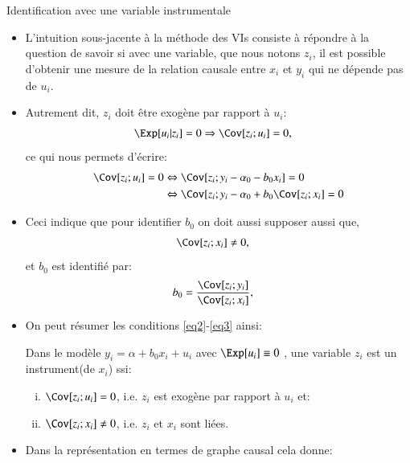 \begin{frame}[allowframebreaks]{Identification avec une variable instrumentale}
    \begin{itemize}
\item L'intuition sous-jacente à la méthode des VIs consiste à répondre à la question 
de savoir si avec une variable, que nous notons $z_i$, il est possible d'obtenir 
une mesure de la relation causale entre $x_i$ et $y_i$ qui ne dépende pas de $u_i$.
\item Autrement dit, $z_i$ doit être exogène par rapport à $u_i$:
\begin{align}
\Exp[u_i| z_i] = 0 &\Rightarrow \Cov[z_i; u_i]= 0,
    \label{eq2}
\end{align}
ce qui nous permets d'écrire:
\begin{align*}
    \Cov[z_i; u_i]= 0 &\Leftrightarrow 
    \Cov[z_i; y_i - \alpha_0 -b_0x_i] = 0\\
    &\Leftrightarrow \Cov[z_i; y_i - \alpha_0 +b_0\Cov[z_i;x_i] = 0
\end{align*}
\item Ceci indique que pour identifier $b_0$  on doit aussi supposer aussi que,
\begin{align}
\Cov[z_i;x_i]  &\neq 0,
\label{eq3}
\end{align}
et $b_0$ est identifié par:
\begin{align}
b_0 &= \frac{\Cov[z_i; y_i]}{\Cov[z_i;x_i]},
    \label{eq4}
\end{align}
\framebreak

\item On peut résumer les conditions \eqref{eq2}-\eqref{eq3} ainsi: 

\begin{definition_fr}
    Dans le modèle $y_i = \alpha + b_0x_i + u_i$ avec $\Exp[u_i] \equiv 0$ , une variable $z_i$ 
    est un instrument(de $x_i$) ssi:
    \begin{enumerate}[(i)]
\item $\Cov[z_i ;u_i ]= 0$, i.e. $z_i$ est exogène par rapport à $u_i$ et:
\item $\Cov[z_i;x_i]\neq 0 $, i.e. $z_i$ et $x_i$ sont liées.
\end{enumerate}
\end{definition_fr}

\item Dans la représentation en termes de graphe causal cela donne:


\end{itemize}
\end{frame}
